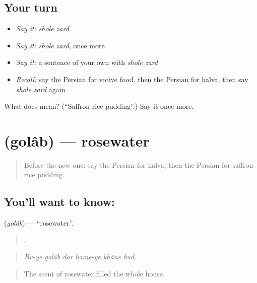 \subsection*{Your turn}
\begin{itemize}
\raggedright
  \item \emph{Say it:} \emph{shole zard}
  \item \emph{Say it:} \emph{shole zard}, once more
  \item \emph{Say it:} a sentence of your own with \emph{shole zard}
  \item \emph{Recall:} say the Persian for votive food, then the Persian for halva, then say \emph{shole zard} again
\end{itemize}

\begin{tcolorbox}[breakable,colback=teal!4,colframe=teal!35!black,title={Before you move on}]
What does   mean? (\textquotedblleft{}Saffron rice pudding\textquotedblright{}.) Say it once more.
\end{tcolorbox}
\section[\texorpdfstring{\fa{گلاب} (golâb)}{گلاب (golâb)}]{ (golâb) — rosewater}

\label{lesson:FA-C344-golab}



\begin{quote}
Before the new one: say the Persian for halva, then the Persian for saffron rice pudding.
\end{quote}

\subsection*{You'll want to know: }
\textbf{} (\emph{golâb}) — \textquotedblleft{}rosewater\textquotedblright{}.

\begin{quote}
     .
\end{quote}

\begin{quote}
\emph{Bu-ye golâb dar hame-ye khâne bud.}
\end{quote}

\begin{quote}
The scent of rosewater filled the whole house.
\end{quote}

